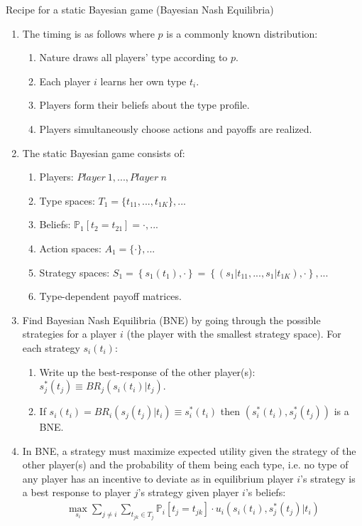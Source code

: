 \begin{frame}{Recipe for a static Bayesian game (Bayesian Nash Equilibria)}
    \begin{enumerate}
      \item The timing is as follows where $p$ is a commonly known distribution:
      \begin{enumerate}\normalsize
        \item Nature draws all players' type according to $p$.
        \item Each player $i$ learns her own type $t_{i}$.
        \item Players form their beliefs about the type profile.
        \item Players simultaneously choose actions and payoffs are realized.
      \end{enumerate}
      \item The static Bayesian game consists of:
      \begin{enumerate}\normalsize
        \item Players: $Player\ 1,...,Player\ n$
        \item Type spaces: $T_1=\{t_{11},...,t_{1K}\},...$
        \item Beliefs: $\mathbb{P}_1[t_2=t_{21}]=\cdot,...$
        \item Action spaces: $A_1=\{\cdot\},...$
        \item Strategy spaces: $S_1=\left\{s_1(t_1),\cdot\right\}=\left\{(s_1|t_{11},...,s_1|t_{1K}),\cdot\right\},...$
        \item Type-dependent payoff matrices.
      \end{enumerate}
      \item Find Bayesian Nash Equilibria (BNE) by going through the possible strategies for a player $i$ (the player with the smallest strategy space). For each strategy $s_i(t_i)$:
      \begin{enumerate}\normalsize
        \item Write up the best-response of the other player(s): $s_j^*(t_j)\equiv BR_j\left(s_i(t_i)|t_j\right)$.
        \item If $s_i(t_i)=BR_i\left(s_j(t_j)|t_i\right)\equiv s_i^*(t_i)$ then $\left(s_i^*(t_i),s_j^*(t_j)\right)$ is a BNE.
      \end{enumerate}
      \item In BNE, a strategy must maximize expected utility given the strategy of the other player(s) and the probability of them being each type, i.e. no type of any player has an incentive to deviate as in equilibrium player $i$'s strategy is a best response to player $j$'s strategy given player $i$'s beliefs:
      \begin{align*}
        \max\limits_{s_i}\sum\limits_{j\neq i}\sum\limits_{t_{jk}\in T_j}\mathbb{P}_i[t_j=t_{jk}]\cdot u_i\left(s_i(t_i),s_j^*(t_j)|t_i\right)
      \end{align*}
    \end{enumerate}
    \vfill\null
\end{frame}



